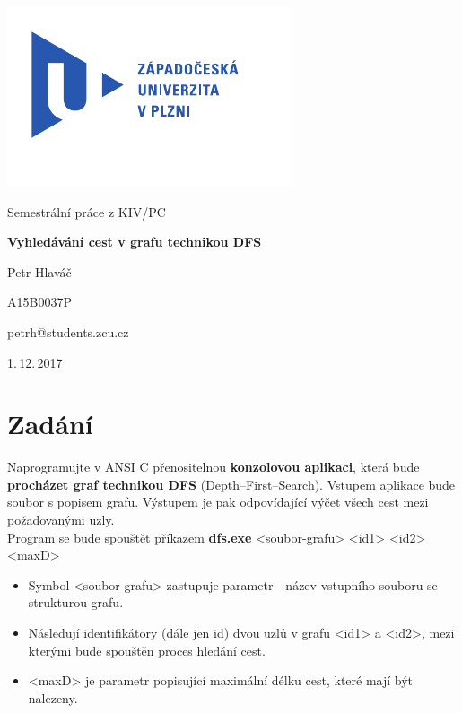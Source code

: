 \documentclass[
12pt,
a4paper,
pdftex,
czech,
titlepage
]{report}
\begin{document}
\begin{titlepage}
	\vspace*{-2cm}
	{\centering\includegraphics[scale=1.0]{logo.pdf}\par}
	\centering
	\vspace*{2cm}
	{\Large Semestrální práce z KIV/PC\par}
	\vspace{1.5cm}
	{\Huge\bfseries Vyhledávání cest v grafu technikou DFS\par}
	\vspace{2cm}

	{\Large Petr Hlaváč\par}
	{\Large A15B0037P\par}
	{\Large petrh@students.zcu.cz\par}

	\vfill

	{\Large 1.\,12.\,2017}
\end{titlepage}

\tableofcontents
\thispagestyle{empty}
\clearpage

\chapter{Zadání}
Naprogramujte v ANSI C přenositelnou \textbf{konzolovou aplikaci}, která bude \textbf{procházet graf technikou DFS} (Depth--First--Search). Vstupem aplikace bude soubor s popisem grafu. Výstupem je pak odpovídající výčet všech cest mezi požadovanými uzly.\\

Program se bude spouštět příkazem \textbf{dfs.exe} <soubor-grafu> <id1> <id2> <maxD>
\begin{itemize}
\item Symbol <soubor-grafu> zastupuje parametr - název vstupního souboru se strukturou grafu.
\item Následují identifikátory (dále jen id) dvou uzlů v grafu <id1> a <id2>, mezi kterými bude spouštěn proces hledání cest.
\item <maxD> je parametr popisující maximální délku cest, které mají být nalezeny.
\end{itemize}
\end{document}
